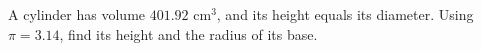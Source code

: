 A cylinder has volume $401.92\text{ cm}^3$, and its height equals its diameter. Using $\pi=3.14$, find its height and the radius of its base.
